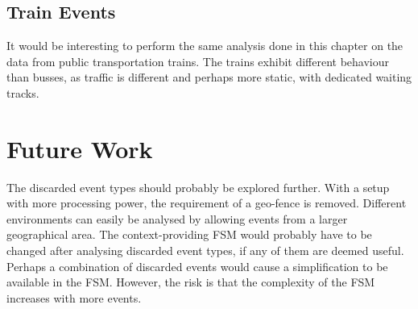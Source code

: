 \subsection{Train Events}
It would be interesting to perform the same analysis done in this chapter on the data from public transportation trains.
The trains exhibit different behaviour than busses, as traffic is different and perhaps more static, with dedicated waiting tracks.

\section{Future Work}
The discarded event types should probably be explored further.
With a setup with more processing power, the requirement of a geo-fence is removed.
Different environments can easily be analysed by allowing events from a larger geographical area.
The context-providing FSM would probably have to be changed after analysing discarded event types, if any of them are deemed useful.
Perhaps a combination of discarded events would cause a simplification to be available in the FSM.
However, the risk is that the complexity of the FSM increases with more events.